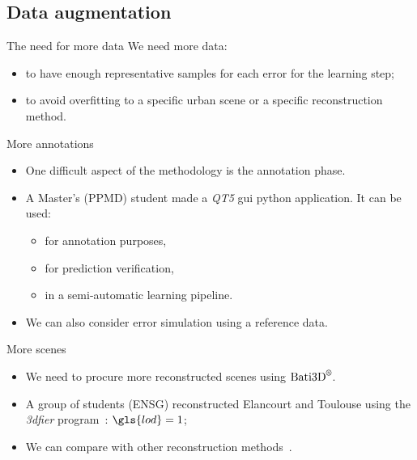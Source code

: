 \documentclass{beamer}
\begin{document}
        \subsection{Data augmentation}
            \begin{frame}{The need for more data}
                We need more data:
                \begin{itemize}[label=$\blacktriangleright$, font=\color{IGNGreen}]
                    \item to have enough representative samples for each error for the learning step;
                    \item to avoid overfitting to a specific urban scene or a specific reconstruction method.
                \end{itemize}
            \end{frame}
            \begin{frame}{More annotations}
                \begin{itemize}[label=$\blacktriangleright$, font=\color{IGNGreen}]
                    \item<1-> One difficult aspect of the methodology is the annotation phase.
                    \item<2-> A Master's (PPMD) student made a \emph{QT5} \acrshort{gui} python application. It can be used:
                    \begin{itemize}[label=--]
                        \item<3-> for annotation purposes,
                        \item<4-> for prediction verification,
                        \item<5-> in a semi-automatic learning pipeline.
                    \end{itemize}
                    \item<6-> We can also consider error simulation using a reference data.
                \end{itemize}
            \end{frame}
            \begin{frame}{More scenes}
                \begin{itemize}[label=$\blacktriangleright$, font=\color{IGNGreen}]
                    \item<1-> We need to procure more reconstructed scenes using $\text{Bati3D}^\text{\textregistered}$.
                    \item<2-> A group of students (ENSG) reconstructed Elancourt and Toulouse using the \emph{3dfier} program~\citep{ledoux2011topologically}: $\gls{lod} = 1$;
                    \item<3-> We can compare with other reconstruction methods~\citep{Lafarge2012,kelly2017bigsur}.
                \end{itemize}
            \end{frame}
\end{document}
